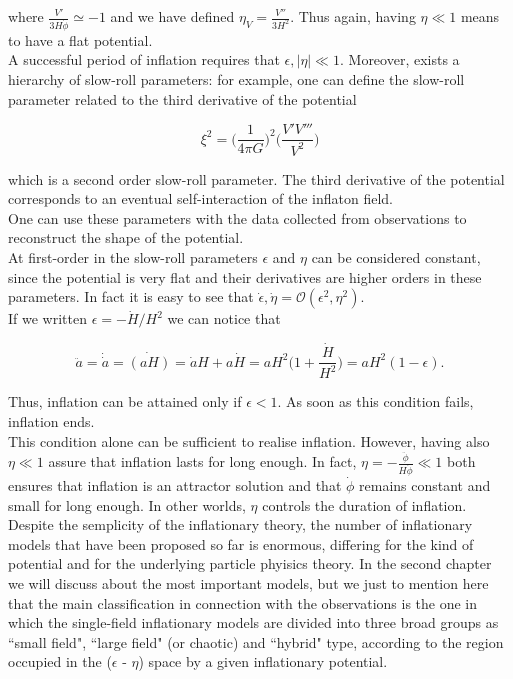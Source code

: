 \documentclass[11pt,a4paper,twoside]{book}
\begin{document}
where $ \frac{V'}{3H\dot{\phi}} \simeq -1 $ and we have defined $ \eta_{V}=\frac{V''}{3H^{2}} $. Thus again, having $\eta \ll 1$ means to have a flat potential.\\

A successful period of inflation requires that $ \epsilon, |\eta| \ll 1 $. Moreover, exists a hierarchy of slow-roll parameters: for example, one can define the slow-roll parameter related to the third derivative of the potential

\begin{equation}
	\label{secondOrderParameter}
	\xi^{2} = \Big (\frac{1}{4\pi G} \Big )^{2} \Big (\frac{V'V'''}{V^{2}}\Big )
\end{equation}

which is a second order slow-roll parameter. The third derivative of the potential corresponds to an eventual self-interaction of the inflaton field. \\
One can use these parameters with the data collected from observations to reconstruct the shape of the potential.\\
At first-order in the slow-roll parameters $\epsilon$ and $\eta$ can be considered constant, since the potential is very flat and their derivatives are higher orders in these parameters. In fact it is easy to see that $ \dot{\epsilon},\dot{\eta} = \mathcal{O}(\epsilon^{2},\eta^{2}) $.\\

If we written $ \epsilon = - \dot{H}/H^{2} $ we can notice that

\begin{equation}
	\label{scaleFactorParameter}
	\ddot{a}=\dot{\dot{a}}=\dot{(aH)}=\dot{a}H + a\dot{H}=aH^{2}\Big (1+\frac{\dot{H}}{H^{2}}\Big ) = aH^{2}(1-\epsilon) .
\end{equation} 

Thus, inflation can be attained only if $\epsilon < 1$. As soon as this condition fails, inflation ends.\\
This condition alone can be sufficient to realise inflation. However, having also $\eta \ll 1 $  assure that inflation lasts for long enough. In fact, $ \eta = - \frac{\ddot{\phi}}{H\dot{\phi}}  \ll 1 $ both ensures that inflation is an attractor solution and that $\dot{\phi}$ remains constant and small for long enough. In other worlds, $\eta$ controls the duration of inflation.\\

Despite the semplicity of the inflationary theory, the number of inflationary models that have been proposed so far is enormous, differing for the kind of potential and for the underlying particle phyisics theory. In the second chapter we will discuss about the most important models, but we just to mention here that the main classification in connection with the observations is the one in which the single-field inflationary models are divided into three broad groups as \textquotedblleft small field", \textquotedblleft large field" (or chaotic) and \textquotedblleft hybrid" type, according to the region occupied in the ($\epsilon$ - $\eta$) space by a given inflationary potential.\\
\end{document}
